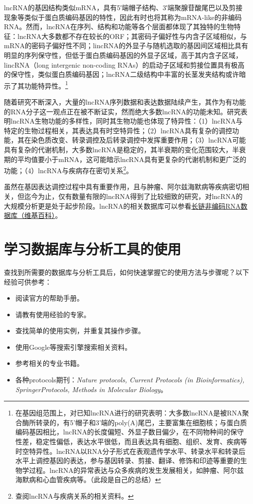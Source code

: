 \documentclass[11pt,a4paper,twoside]{book}
\begin{document}
lncRNA的基因结构类似mRNA，具有5′端帽子结构、3′端聚腺苷酸尾巴以及剪接现象等类似于蛋白质编码基因的特性，因此有时也将其称为mRNA-like的非编码RNA。然而，lncRNA在序列、结构和功能等各个层面都体现了其独特的生物特征：lncRNA大多数都不存在较长的ORF；其密码子偏好性与内含子区域相似，与mRNA的密码子偏好性不同；lincRNA的外显子与随机选取的基因间区域相比具有明显的序列保守性，但低于蛋白质编码基因的外显子区域，高于其内含子区域，lincRNA（long intergenic non-coding RNAs）的启动子区域和剪接位置具有极高的保守性，类似蛋白质编码基因；lncRNA二级结构中丰富的长茎发夹结构或许暗示了其功能特异性。\footnote{在基因组范围上，对已知lncRNA进行的研究表明：大多数lncRNA是被RNA聚合酶所转录的，有5'帽子和3'端的poly(A)尾巴，主要富集在细胞核；与蛋白质编码基因相比，lncRNA的长度偏短、外显子数目偏少，在不同物种间的保守性差，稳定性偏低，表达水平很低，而且表达具有细胞、组织、发育、疾病等时空特异性。lncRNA以RNA分子形式在表观遗传学水平、转录水平和转录后水平上调控基因的表达，参与基因转录、剪接、翻译、修饰和印迹等重要的生物学过程。lncRNA的异常表达与众多疾病的发生发展相关，如肿瘤、阿尔兹海默病和心血管疾病等。（此段是自己的总结）}

随着研究不断深入，大量的lncRNA序列数据和表达数据陆续产生，其作为有功能的RNA分子这一观点正在被不断证实，然而绝大多数lncRNA的功能未知。研究表明lncRNA生物功能的多样性，同时其生物功能也体现了特异性：（1）lncRNA与特定的生物过程相关，其表达具有时空特异性；（2）lncRNA具有复杂的调控功能，其在染色质改变、转录调控及后转录调控中发挥重要作用；（3）lncRNA可能具有复杂的代谢机制，大多数lncRNA是稳定的，其半衰期的变化范围较大，半衰期的平均值要小于mRNA，这可能暗示lncRNA具有更复杂的代谢机制和更广泛的功能；（4）lncRNA与疾病存在密切关系\footnote{查阅lncRNA与疾病关系的相关资料。}。

虽然在基因表达调控过程中具有重要作用，且与肿瘤、阿尔兹海默病等疾病密切相关，但迄今为止，仅有数量有限的lncRNA得到了比较细致的研究，对lncRNA的大规模分析更是处于起步阶段。lncRNA的相关数据库可以参看\href{http://zh.wikipedia.org/wiki/\%E9\%95\%BF\%E9\%93\%BE\%E9\%9D\%9E\%E7\%BC\%96\%E7\%A0\%81RNA\%E6\%95\%B0\%E6\%8D\%AE\%E5\%BA\%93}{长链非编码RNA数据库（维基百科）}。

\section{学习数据库与分析工具的使用}
查找到所需要的数据库与分析工具后，如何快速掌握它的使用方法与步骤呢？以下经验可供参考：
\begin{itemize}
  \item 阅读官方的帮助手册。
  \item 请教有使用经验的专家。
  \item 查找简单的使用实例，并重复其操作步骤。
  \item 使用Google等搜索引擎搜索相关资料。
  \item 参考相关的专业书籍。
  \item 各种protocols期刊：\textit{Nature protocols, Current Protocols (in Bioinformatics), SpringerProtocols, Methods in Molecular Biology}。
\end{itemize}
\end{document}
